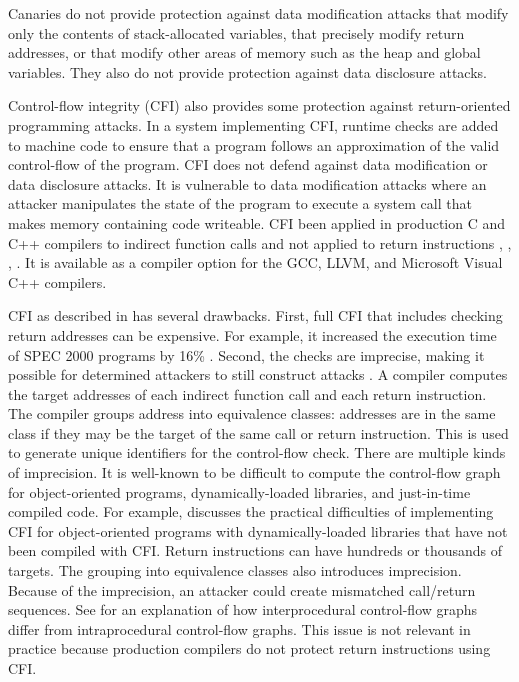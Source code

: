 Canaries do not provide protection against data modification attacks
that modify only the contents of stack-allocated variables, that
precisely modify return addresses, or that modify other areas 
of memory such as the heap and global variables. They also do not
provide protection against data disclosure attacks. 

Control-flow integrity (CFI) \cite{Abadi2005} also provides some protection
against return-oriented programming attacks.  In a system implementing CFI, runtime checks are added to machine code to ensure that a program follows an approximation of the valid control-flow of the program.  CFI does not defend against data modification or data disclosure attacks.  It is vulnerable to data
modification attacks where an attacker manipulates the state of the program to
execute a system call that makes memory containing code writeable.  CFI 
been applied in production C and C++ compilers to indirect function
calls and not applied to return instructions \cite{Tice2014}, 
\cite{LLVMCFG2016}, \cite{GCCCFG2016}, \cite{MicrosoftCFG2016}.  It 
is available as a compiler option for the GCC, LLVM, and Microsoft Visual C++
compilers.

CFI as described in \cite{Abadi2005} has several drawbacks.  First, full CFI
that includes checking return addresses can be expensive.  
For example, it increased
the execution time of SPEC 2000 programs by 16\% \cite{Abadi2005}.  
Second, the checks are imprecise, making it possible for
determined attackers to still construct attacks \cite{Goktas2014}.
A compiler computes the target addresses of each indirect 
function call and each return instruction.  The
compiler groups address into equivalence classes: addresses are in the same 
class if they may be the target of the same call or return instruction.  This is
used to generate unique identifiers for the control-flow check.  There are
multiple kinds of imprecision.   It is well-known to be difficult to compute the 
control-flow graph for object-oriented programs,  dynamically-loaded libraries,  and just-in-time compiled code.  For example, \cite{Tice2014} discusses
the practical difficulties of implementing CFI for object-oriented programs with
dynamically-loaded libraries that have not been compiled with CFI.  Return instructions can have hundreds or
thousands of targets.  The grouping into equivalence classes also introduces 
imprecision.  Because of the imprecision, an attacker could create mismatched call/return sequences.  See \cite{Horwitz1990}
for an explanation of how interprocedural control-flow graphs differ from
 intraprocedural control-flow graphs. This issue is not relevant in practice because production compilers do not protect return instructions using CFI.
 
